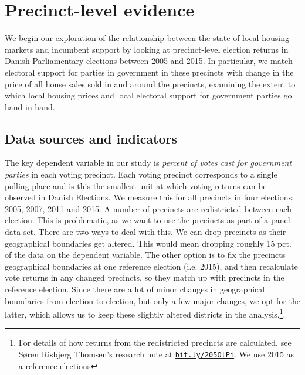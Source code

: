 \documentclass[12pt,a4paper]{article}
\begin{document}


\section{Precinct-level evidence}\label{precinctlevel}
We begin our exploration of the relationship between the state of local housing markets and incumbent support by looking at precinct-level election returns in Danish Parliamentary elections between 2005 and 2015. In particular, we match electoral support for parties in government in these precincts with change in the price of all house sales sold in and around the precincts, examining the extent to which local housing prices and local electoral support for government parties go hand in hand.

\subsection{Data sources and indicators}
The key dependent variable in our study is \textit{percent of votes cast for government parties} in each voting precinct. Each voting precinct corresponds to a single polling place and is this the smallest unit at which voting returns can be observed in Danish Elections. We measure this for all precincts in four elections:  2005, 2007, 2011 and 2015. A number of precincts are redistricted between each election. This is problematic, as we want to use  the precincts as part of a panel data set. There are two ways to deal with this. We can drop precincts as their geographical boundaries get altered. This would mean dropping roughly 15 pct. of the data on the dependent variable. The other option is to fix the precincts geographical boundaries at one reference election (i.e. 2015), and then recalculate vote returns in any changed precincts, so they match up with precincts in the reference election. Since there are a lot of minor changes in geographical boundaries from election to election, but only a few major changes, we opt for the latter, which allows us to keep these slightly altered districts in the analysis.\footnote{For details of how returns from the redistricted precincts are calculated, see Søren Risbjerg Thomsen's research note at \texttt{\href{http://bit.ly/205OlPi}{bit.ly/205OlPi}}.  We use 2015 as a reference elections}. 
\end{document}
